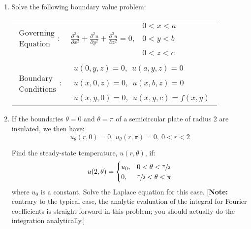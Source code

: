 \begin{fullwidth}
\begin{enumerate}
\item Solve the following boundary value problem:
\begin{table}[h!]
\begin{tabular}{l l}
$\substack{\text{Governing} \\\text{Equation}}: $& $\frac{\partial^2 u}{\partial x^2}+ \frac{\partial^2 u}{\partial y^2} + \frac{\partial^2 u}{\partial z^2} = 0, \ \ \substack{0 < x < a \\ \\ 0 < y < b \\ \\ 0 < z < c}$ \\
& \\
$\substack{\text{Boundary} \\ \text{Conditions}}: $& $ \substack{u(0,y,z)=0, \ \ u(a,y,z) = 0 \\ \\ u(x,0,z) = 0, \ \ u(x,b,z) = 0 \\ \\ u(x,y,0) = 0, \ \ u(x,y,c) = f(x,y)}$\\
\end{tabular}
\end{table}

\vspace{2.0cm}

\item If the boundaries $\theta = 0$ and $\theta = \pi$ of a semicircular plate of radius 2 are insulated, we then have:
\begin{equation*}
u_{\theta}(r,0) = 0, \ u_{\theta}(r,\pi) = 0, \ 0 < r < 2
\end{equation*}

\vspace{0.25cm}

\noindent Find the steady-state temperature, $u(r,\theta)$, if:
\begin{equation*}
u(2,\theta) = 
\begin{cases}
u_0, & 0 < \theta < \sfrac{\pi}{2} \\
0, & \sfrac{\pi}{2} < \theta < \pi
\end{cases}
\end{equation*}
where $u_0$ is a constant.  Solve the Laplace equation for this case. [\textbf{Note:} contrary to the typical case, the analytic evaluation of the integral for Fourier coefficients is straight-forward in this problem; you should actually do the integration analytically.]

\vspace{2.0cm}


\end{enumerate}
\end{fullwidth}
